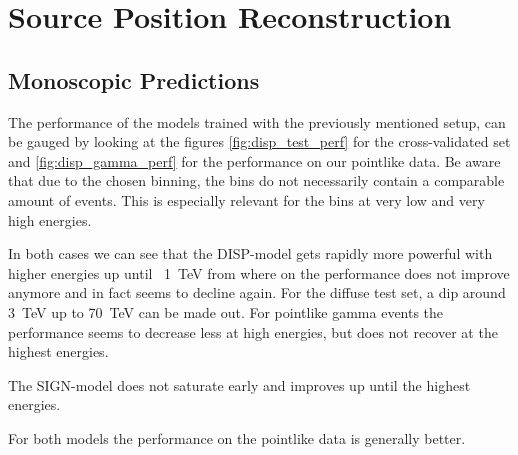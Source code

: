 \section{Source Position Reconstruction}\label{position}

\subsection{Monoscopic Predictions}

The performance of the models trained with the previously mentioned setup,
can be gauged by looking at the 
figures \ref{fig:disp_test_perf} for the cross-validated set and 
\ref{fig:disp_gamma_perf} for the performance on our 
pointlike data. Be aware that due to the chosen binning,
the bins do not necessarily contain a comparable amount of events.
This is especially relevant for the bins at very low and very high energies.

In both cases we can see that the DISP-model gets rapidly more
powerful with higher energies up until ~\SI{1}{\tera\electronvolt} from 
where on the performance does not improve anymore and in fact seems to decline
again. For the diffuse test set, a dip around \SI{3}{\tera\electronvolt}
up to \SI{70}{\tera\electronvolt} can be made out.
For pointlike gamma events the performance seems to decrease less at high energies, but does not 
recover at the highest energies.

The SIGN-model does not saturate early and improves up until the highest energies. 

For both models the performance on the pointlike data is generally better.

